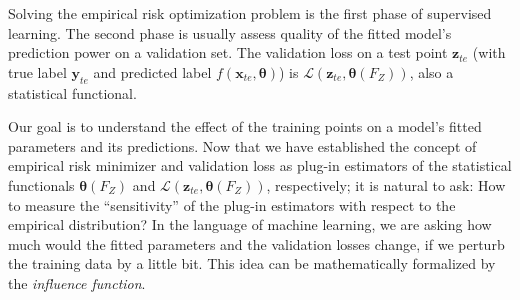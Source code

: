 \documentclass{article}
\begin{document}
Solving the empirical risk optimization problem is the first phase of supervised learning. The second phase is usually assess quality of the fitted model's prediction power on a validation set. The validation loss on a test point $\bm{z}_{te}$ (with true label $\bm{y}_{te}$ and predicted label $f(\bm{x}_{te}, \bm{\theta})$) is $\mathcal{L}(\bm{z}_{te}, \bm{\theta}(F_Z))$, also a statistical functional.

Our goal is to understand the effect of the training points on a model’s fitted parameters and its predictions. Now that we have established the concept of empirical risk minimizer and validation loss as plug-in estimators of the statistical functionals $\bm{\theta}(F_Z)$ and $\mathcal{L}(\bm{z}_{te}, \bm{\theta}(F_Z))$, respectively; it is natural to ask: How to measure the ``sensitivity'' of the plug-in estimators with respect to the empirical distribution? In the language of machine learning, we are asking how much would the fitted parameters and the validation losses change, if we perturb the training data by a little bit. This idea can be mathematically formalized by the \emph{influence function}.
\end{document}
